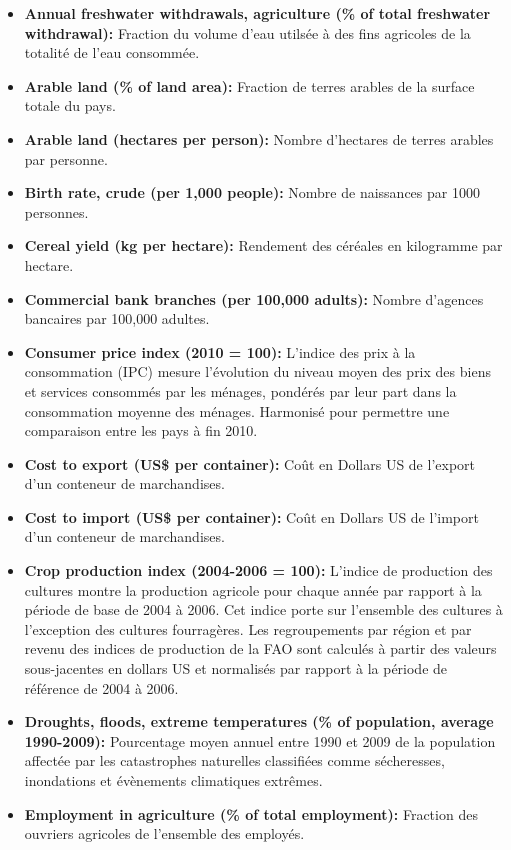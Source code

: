 \begin{itemize}
		\item \textbf{ Annual freshwater withdrawals, agriculture (\% of total freshwater withdrawal):} Fraction du volume d'eau utilsée à des fins agricoles de la totalité de l'eau consommée.
		\item \textbf{ Arable land (\% of land area):} Fraction de terres arables de la surface totale du pays.
		\item \textbf{ Arable land (hectares per person):} Nombre d'hectares de terres arables par personne.
		\item \textbf{ Birth rate, crude (per 1,000 people):} Nombre de naissances par 1000 personnes.
		\item \textbf{ Cereal yield (kg per hectare):} Rendement des céréales en kilogramme par hectare.
		\item \textbf{ Commercial bank branches (per 100,000 adults):} Nombre d'agences bancaires par 100,000 adultes.
		\item \textbf{ Consumer price index (2010 = 100):} L'indice des prix à la consommation (IPC) mesure l'évolution du niveau moyen des prix des biens et services consommés par les ménages, pondérés par leur part dans la consommation moyenne des ménages. Harmonisé pour permettre une comparaison entre les pays à fin 2010.
		\item \textbf{ Cost to export (US\$ per container):} Coût en Dollars US de l'export d'un conteneur de marchandises.
		\item \textbf{ Cost to import (US\$ per container):} Coût en Dollars US de l'import d'un conteneur de marchandises.
		\item \textbf{ Crop production index (2004-2006 = 100):} 
		L'indice de production des cultures montre la production agricole pour chaque année par rapport à la période de base de 2004 à 2006. Cet indice porte sur l'ensemble des cultures à l'exception des cultures fourragères. Les regroupements par région et par revenu des indices de production de la FAO sont calculés à partir des valeurs sous-jacentes en dollars US et normalisés par rapport à la période de référence de 2004 à 2006.
		\item \textbf{ Droughts, floods, extreme temperatures (\% of population, average 1990-2009):} Pourcentage moyen annuel entre 1990 et 2009 de la population affectée par les catastrophes naturelles classifiées comme sécheresses, inondations et évènements climatiques extrêmes.
		\item \textbf{ Employment in agriculture (\% of total employment):} Fraction des ouvriers agricoles de l'ensemble des employés.

\end{itemize}
